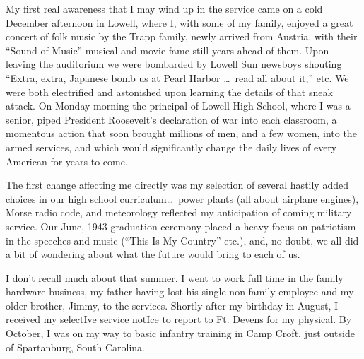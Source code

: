 \documentclass[../m3y]{subfiles}
\begin{document}
My first real awareness that I may wind up in the service came on a cold December afternoon in Lowell, where I, with some of my family, enjoyed a great concert of folk music by the Trapp family, newly arrived from Austria, with their ``Sound of Music'' musical and movie fame still years ahead of them. Upon leaving the auditorium we were bombarded by Lowell Sun newsboys shouting ``Extra, extra, Japanese bomb us at Pearl Harbor \ldots\ read all about it,'' etc. We were both electrified and astonished upon learning the details of that sneak attack. On Monday morning the principal of Lowell High School, where I was a senior, piped President Roosevelt's declaration of war into each classroom, a momentous action that soon brought millions of men, and a few women, into the armed services, and which would significantly change the daily lives of every American for years to come.


The first change affecting me directly was my selection of several hastily added choices in our high school curriculum\ldots\ power plants (all about airplane engines), Morse radio code, and meteorology reflected my anticipation of coming military service. Our June, 1943 graduation ceremony placed a heavy focus on patriotism in the speeches and music (``This Is My Country'' etc.), and, no doubt, we all did a bit of wondering about what the future would bring to each of us.


I don't recall much about that summer. I went to work full time in the family hardware business, my father having lost his single non-family employee and my older brother, Jimmy, to the services. Shortly after my  birthday in August, I received my selectIve service notIce to report to Ft. Devens for my physical. By October, I was on my way to basic infantry training in Camp Croft, just outside of Spartanburg, South Carolina.
\end{document}
